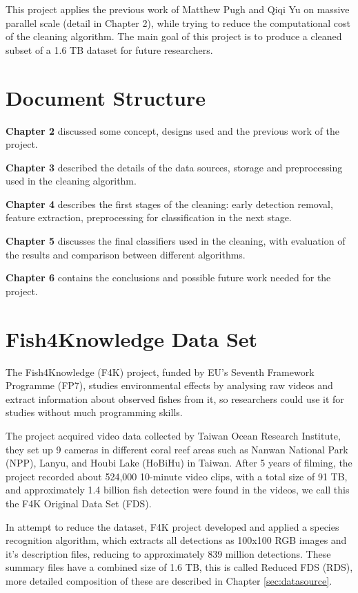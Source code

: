\documentclass[bsc,logo,twoside,fullspacing,parskip]{infthesis}
\begin{document}

This project applies the previous work of Matthew Pugh\cite{P1} and Qiqi Yu\cite{P3} on massive parallel scale (detail in Chapter 2), while trying to reduce the computational cost of the cleaning algorithm. The main goal of this project is to produce a cleaned subset of a 1.6 TB dataset for future researchers.

\section{Document Structure}

\textbf{Chapter 2} discussed some concept, designs used and the previous work of the project.

\textbf{Chapter 3} described the details of the data sources, storage and preprocessing used in the cleaning algorithm.

\textbf{Chapter 4} describes the first stages of the cleaning: early detection removal, feature extraction, preprocessing for classification in the next stage.

\textbf{Chapter 5} discusses the final classifiers used in the cleaning, with evaluation of the results and comparison between different algorithms. 

\textbf{Chapter 6} contains the conclusions and possible future work needed for the project.

\section{Fish4Knowledge Data Set}

The Fish4Knowledge (F4K) project, funded by EU's Seventh Framework Programme (FP7), studies environmental effects by analysing raw videos and extract information about observed fishes from it, so researchers could use it for studies without much programming skills. 

The project acquired video data collected by Taiwan Ocean Research Institute, they set up 9 cameras in different coral reef areas such as Nanwan National Park (NPP), Lanyu, and Houbi Lake (HoBiHu) in Taiwan. 
After 5 years of filming, the project recorded about 524,000 10-minute video clips, with a total size of 91 TB, and approximately 1.4 billion fish detection were found in the videos, we call this the F4K Original Data Set (FDS).

In attempt to reduce the dataset, F4K project developed and applied a species recognition algorithm, which extracts all detections as 100x100 RGB images and it's description files, reducing to approximately 839 million detections. These summary files have a combined size of 1.6 TB, this is called Reduced FDS (RDS), more detailed composition of these are described in Chapter \ref{sec:datasource}.
\end{document}
